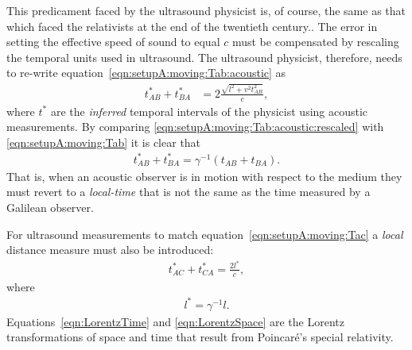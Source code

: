 \documentclass[10pt, fleqn,final,showtrims,oldfontcommands, article,a4paper,oneside]{memoir} %
\newcommand{\eqnref}[1]{\ref{eqn:#1}}
\newcommand{\lr}[1]{\left( #1 \right)}
\newcommand{\Poincare}{Poincar{\'e}}
\begin{document}
This predicament faced by the ultrasound physicist  is, of course, the same as that which faced the relativists at the end of the twentieth century..
The error in setting the effective speed of sound to equal $c$  must be compensated by rescaling the temporal units used in ultrasound.
The ultrasound physicist, therefore,  needs to re-write equation~\ref{eqn:setupA:moving:Tab:acoustic} as
\begin{align}
 t_{AB}^\ast+t_{BA}^\ast  &= 2\frac{\sqrt{l^2+v^2t_{AB}^2}}{c},\label{eqn:setupA:moving:Tab:acoustic:rescaled}
\end{align}
where $t^\ast$ are the {\em inferred} temporal intervals of the physicist using acoustic measurements.
By comparing \eqnref{setupA:moving:Tab:acoustic:rescaled} with \eqnref{setupA:moving:Tab} it is clear that
\begin{align}
 t_{AB}^\ast+t_{BA}^\ast = \gamma^{-1}\lr{t_{AB}+t_{BA}}.\label{eqn:LorentzTime}
\end{align}
That is, when an acoustic observer is in motion with respect to the medium 
they must revert to a {\em local-time} that is not the same as the time measured by a Galilean observer.

For  ultrasound measurements to match equation~\ref{eqn:setupA:moving:Tac} 
a {\em local} distance measure must also be introduced: %
\begin{align}
  t_{AC}^\ast+t_{CA}^\ast = \frac{2l^\ast}{c},
\end{align}
where 
\begin{align}
l^\ast = \gamma^{-1} l.\label{eqn:LorentzSpace}
\end{align}
Equations~\ref{eqn:LorentzTime} and \ref{eqn:LorentzSpace} are the Lorentz transformations of space and time that result from \Poincare's special relativity.
\end{document}
